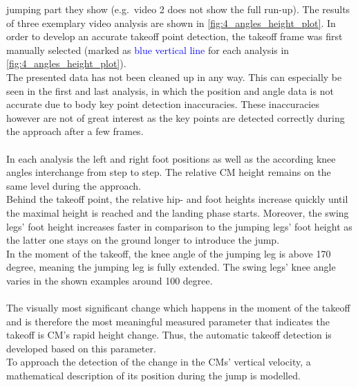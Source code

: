 jumping part they show (e.g.\ video 2 does not show the full run-up).
The results of three exemplary video analysis are shown in
\autoref{fig:4_angles_height_plot}.
In order to develop an accurate takeoff point detection, the takeoff frame was
first manually selected (marked as \textcolor{blue}{blue vertical line} for
each analysis in \autoref{fig:4_angles_height_plot}).\\
The presented data has not been cleaned up in any way.
This can especially be seen in the first and last analysis, in which the
position and angle data is not accurate due to body key point detection
inaccuracies.
These inaccuracies however are not of great interest as the key points are
detected correctly during the approach after a few frames.\\\\
In each analysis the left and right foot positions as well as the
according knee angles interchange from step to step.
The relative \ac{CM} height remains on the same level during the approach.\\
Behind the takeoff point, the relative hip- and foot heights increase quickly
until the maximal height is reached and the landing phase starts.
Moreover, the swing legs' foot height increases faster in comparison to the
jumping legs' foot height as the latter one stays on the ground longer to
introduce the jump.\\
In the moment of the takeoff, the knee angle of the jumping leg is above 170
degree, meaning the jumping leg is fully extended.
The swing legs' knee angle varies in the shown examples around 100 degree.\\\\
The visually most significant change which happens in the moment of the
takeoff and is therefore the most meaningful measured parameter that indicates
the takeoff is \ac{CM}'s rapid height change.
Thus, the automatic takeoff detection is developed based on this parameter.\\
To approach the detection of the change in the \ac{CM}s' vertical
velocity, a mathematical description of its position during the jump is
modelled.

